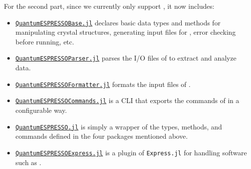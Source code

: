 \begin{frame}[allowframebreaks]
    For the second part, since we currently only support \qe{}, it now includes:
    {\footnotesize
    \begin{itemize}
        \item \href{https://github.com/MineralsCloud/QuantumESPRESSOBase.jl}{\texttt{QuantumESPRESSOBase.jl}}
              declares basic data types and methods
              for manipulating crystal structures, generating input files for \qe{},
              error checking before running, etc.
        \item \href{https://github.com/MineralsCloud/QuantumESPRESSOParser.jl}{\texttt{QuantumESPRESSOParser.jl}}
              parses the I/O files of \qe{} to extract and analyze data.
        \item \href{https://github.com/MineralsCloud/QuantumESPRESSOFormatter.jl}{\texttt{QuantumESPRESSOFormatter.jl}}
              formats the input files of \qe{}.
        \item \href{https://github.com/MineralsCloud/QuantumESPRESSOCommands.jl}{\texttt{QuantumESPRESSOCommands.jl}}
              is a CLI that exports the commands of \qe{} in a configurable way.
        \item \href{https://github.com/MineralsCloud/QuantumESPRESSO.jl}{\texttt{QuantumESPRESSO.jl}}
              is simply a wrapper of the types, methods, and commands defined in
              the four packages mentioned above.
        \item \href{https://github.com/MineralsCloud/QuantumESPRESSOExpress.jl}{\texttt{QuantumESPRESSOExpress.jl}}
              is a plugin of \texttt{Express.jl} for handling \ab{} software such as \qe{}.
    \end{itemize}
    }
\end{frame}
